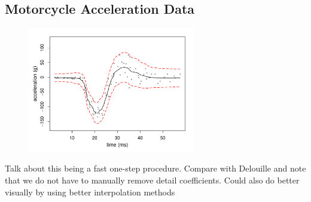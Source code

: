\documentclass[12pt]{article}
\begin{document}
\subsection{Motorcycle Acceleration Data}
\begin{figure}
\centering
    \includegraphics[width=0.65\textwidth]{motorcycle.pdf}
    \caption{}
    \label{fig:motorcycle}
\end{figure}

Talk about this being a fast one-step procedure. Compare with Delouille and note that we do not have to manually remove detail coefficients. Could also do better visually by using better interpolation methods
\newpage
\end{document}
